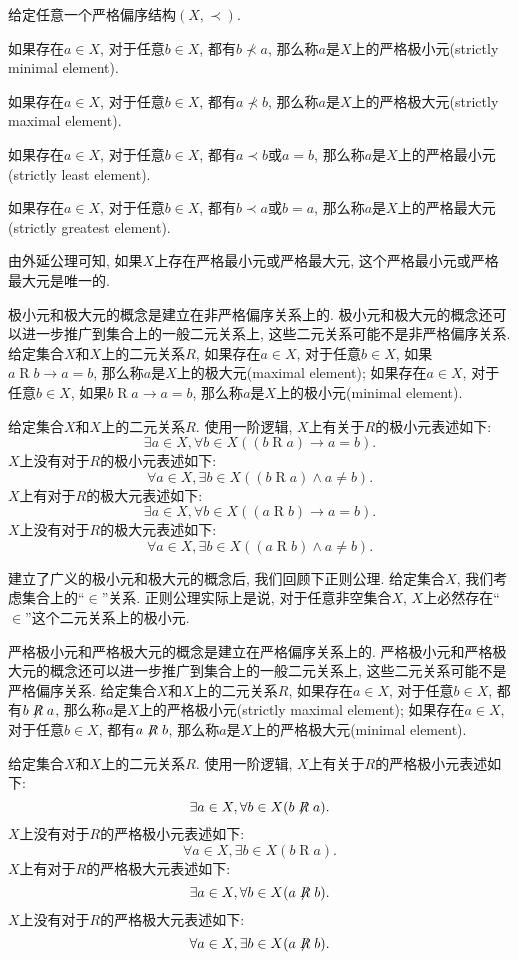 \begin{definition}
	给定任意一个严格偏序结构$(X,\prec)$.
	
	如果存在$a\in X$, 对于任意$b\in X$, 都有$b\not \prec a$, 那么称$a$是$X$上的严格极小元(strictly minimal element).
	
	如果存在$a\in X$, 对于任意$b\in X$, 都有$a\not \prec b$, 那么称$a$是$X$上的严格极大元(strictly maximal element).	
	
	如果存在$a\in X$, 对于任意$b\in X$, 都有$a\prec b$或$a=b$, 那么称$a$是$X$上的严格最小元(strictly least element).
	
	如果存在$a\in X$, 对于任意$b\in X$, 都有$b\prec a$或$b=a$, 那么称$a$是$X$上的严格最大元(strictly greatest element).
\end{definition}

由外延公理可知, 如果$X$上存在严格最小元或严格最大元, 这个严格最小元或严格最大元是唯一的.

极小元和极大元的概念是建立在非严格偏序关系上的. 极小元和极大元的概念还可以进一步推广到集合上的一般二元关系上, 这些二元关系可能不是非严格偏序关系. 给定集合$X$和$X$上的二元关系$R$, 如果存在$a\in X$, 对于任意$b\in X$, 如果$a\mathrel Rb\rightarrow a=b$, 那么称$a$是$X$上的极大元(maximal element); 如果存在$a\in X$, 对于任意$b\in X$, 如果$b\mathrel Ra\rightarrow a=b$, 那么称$a$是$X$上的极小元(minimal element).

给定集合$X$和$X$上的二元关系$R$. 使用一阶逻辑, $X$上有关于$R$的极小元表述如下:
\[
\exists a\in X,\forall b\in X((b\mathrel Ra)\rightarrow a=b).
\]
$X$上没有对于$R$的极小元表述如下:
\[
\forall a\in X,\exists b\in X((b\mathrel Ra)\wedge a\neq b).
\]
$X$上有对于$R$的极大元表述如下:
\[
\exists a\in X,\forall b\in X((a\mathrel Rb)\rightarrow a=b).
\]
$X$上没有对于$R$的极大元表述如下:
\[
\forall a\in X,\exists b\in X((a\mathrel Rb)\wedge a\neq b).
\]

建立了广义的极小元和极大元的概念后, 我们回顾下正则公理. 给定集合$X$, 我们考虑集合上的``$\in$''关系. 正则公理实际上是说, 对于任意非空集合$X$, $X$上必然存在``$\in$''这个二元关系上的极小元.

严格极小元和严格极大元的概念是建立在严格偏序关系上的. 严格极小元和严格极大元的概念还可以进一步推广到集合上的一般二元关系上, 这些二元关系可能不是严格偏序关系. 给定集合$X$和$X$上的二元关系$R$, 如果存在$a\in X$, 对于任意$b\in X$, 都有$b\not \mathrel Ra$, 那么称$a$是$X$上的严格极小元(strictly maximal element); 如果存在$a\in X$, 对于任意$b\in X$, 都有$a\not \mathrel Rb$, 那么称$a$是$X$上的严格极大元(minimal element).

给定集合$X$和$X$上的二元关系$R$. 使用一阶逻辑, $X$上有关于$R$的严格极小元表述如下:
\[
\exists a\in X,\forall b\in X(b\not \mathrel Ra).
\]
$X$上没有对于$R$的严格极小元表述如下:
\[
\forall a\in X,\exists b\in X(b\mathrel Ra).
\]
$X$上有对于$R$的严格极大元表述如下:
\[
\exists a\in X,\forall b\in X(a\not \mathrel Rb).
\]
$X$上没有对于$R$的严格极大元表述如下:
\[
\forall a\in X,\exists b\in X(a\not \mathrel Rb).
\]

